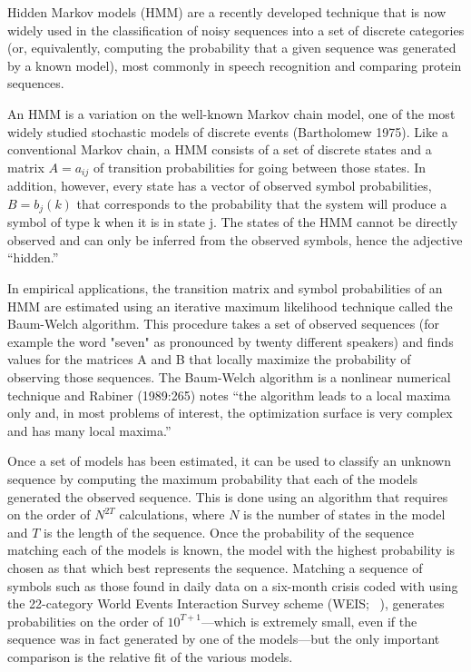 \documentclass[graybox]{svmult}
\begin{document}
{\color{blue}{[this will be considerably shortened to adjust for the content of the Bond HMM paper]}}

Hidden Markov models (HMM) are a recently developed technique that is now widely used in
the classification of noisy sequences into a set of discrete categories (or, equivalently, computing
the probability that a given sequence was generated by a known model), most commonly in speech recognition and comparing protein sequences.

An HMM is a variation on the well-known Markov chain model, one of the most widely
studied stochastic models of discrete events (Bartholomew 1975). Like a conventional Markov
chain, a HMM consists of a set of discrete states and a matrix $A = a_{ij}$ of transition
probabilities for going between those states. In addition, however, every state has a vector of
observed symbol probabilities, $B = {b_j(k)}$ that corresponds to the probability that the system
will produce a symbol of type k when it is in state j. The states of the HMM cannot be directly
observed and can only be inferred from the observed symbols, hence the adjective ``hidden.''

In empirical applications, the transition matrix and symbol probabilities of an HMM are
estimated using an iterative maximum likelihood technique called the Baum-Welch algorithm.
This procedure takes a set of observed sequences (for example the word "seven" as pronounced
by twenty different speakers) and finds
values for the matrices A and B that locally maximize the probability of observing those
sequences. The Baum-Welch algorithm is a nonlinear numerical technique and Rabiner
(1989:265) notes ``the algorithm leads to a local maxima only and, in most problems of interest,
the optimization surface is very complex and has many local maxima.''

Once a set of models has been estimated, it can be used to classify an unknown sequence by
computing the maximum probability that each of the models generated the observed sequence.
This is done using an algorithm that requires on the order of $N^{2T}$ calculations, where $N$ is the
number of states in the model and $T$ is the length of the sequence. Once the probability of the
sequence matching each of the models is known, the model with the highest probability is chosen
as that which best represents the sequence. Matching a sequence of symbols such as those found
in daily data on a six-month crisis coded with using the 22-category World Events Interaction
Survey scheme (WEIS; ~\cite{McClelland76}), generates probabilities on the order of $10^{T+1}$---which
is extremely small, even if the sequence was in fact generated by one of the models---but the only
important comparison is the relative fit of the various models.
\end{document}
